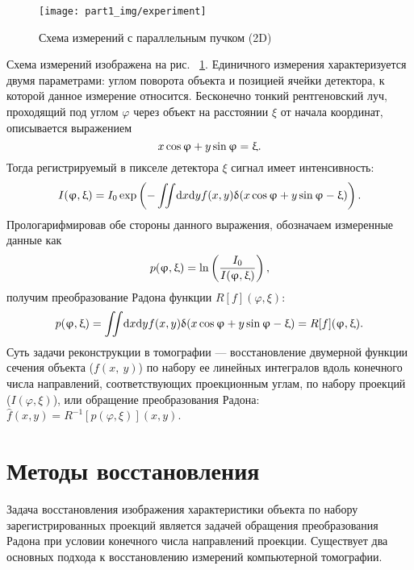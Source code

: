 \begin{figure}[h!]
  \centering
  \texttt{[image: part1\_img/experiment]}
  \caption{Схема измерений с параллельным пучком (2D)}
  \label{fig:experiment}
\end{figure}

Схема измерений изображена на рис. ~\ref{fig:experiment}.
Единичного измерения характеризуется двумя параметрами: углом поворота объекта и позицией ячейки детектора, к которой данное измерение относится.
Бесконечно тонкий рентгеновский луч, проходящий под углом $\varphi$  через объект на расстоянии $\xi$  от начала координат, описывается выражением
\begin{equation}\notag
  x\cos\varphi + y\sin\varphi = \xi.
\end{equation}
Тогда регистрируемый в пикселе детектора $\xi$ сигнал имеет интенсивность:
\begin{equation}\notag
  I(\varphi, \xi) = I_0 \exp\left( {-\iint \! \mathrm d x \mathrm d y f(x,y)\delta(x\cos\varphi + y\sin\varphi - \xi)}\right).
\end{equation}
Прологарифмировав обе стороны данного выражения, обозначаем измеренные данные как
\begin{equation}\notag
  p(\varphi, \xi) = \ln \left (\frac{I_0}{I(\varphi, \xi)} \right),
\end{equation}
получим преобразование Радона функции $R[f](\varphi, \xi)$:
\begin{equation}\notag
  p(\varphi, \xi)= \iint \! \mathrm d x \mathrm d y f(x,y)\delta(x\cos\varphi + y\sin\varphi - \xi) = R[f](\varphi, \xi).
\end{equation}
Суть задачи реконструкции в томографии --- восстановление двумерной функции сечения объекта ($f(x,\ y)$) по набору ее линейных интегралов вдоль конечного числа направлений, соответствующих проекционным углам, по набору проекций ($I(\varphi, \xi)$), или обращение преобразования Радона: $\hat{f}(x, y) = R^{-1}[p(\varphi, \xi)](x, y)$.

\section{Методы восстановления}
Задача восстановления изображения характеристики объекта по набору зарегистрированных проекций является задачей обращения преобразования Радона при условии конечного числа направлений проекции.
Существует два основных подхода к восстановлению измерений компьютерной томографии.

